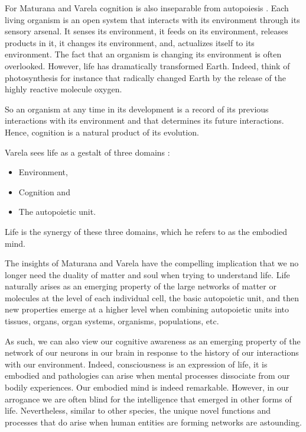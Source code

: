 \documentclass[
  11pt,
]{book}
\providecommand{\tightlist}{%
  \setlength{\itemsep}{0pt}\setlength{\parskip}{0pt}}
\begin{document}
For Maturana and Varela cognition is also inseparable from autopoiesis \citep{capraLuisi2014}. Each living organism is an open system that interacts with its environment through its sensory arsenal. It senses its environment, it feeds on its environment, releases products in it, it changes its environment, and, actualizes itself to its environment. The fact that an organism is changing its environment is often overlooked. However, life has dramatically transformed Earth. Indeed, think of photosynthesis for instance that radically changed Earth by the release of the highly reactive molecule oxygen.

So an organism at any time in its development is a record of its previous interactions with its environment and that determines its future interactions.
Hence, cognition is a natural product of its evolution.

Varela sees life as a gestalt of three domains \citep{capraLuisi2014}:

\begin{itemize}
\tightlist
\item
  Environment,
\item
  Cognition and
\item
  The autopoietic unit.
\end{itemize}

Life is the synergy of these three domains, which he refers to as the embodied mind.

The insights of Maturana and Varela have the compelling implication that we no longer need the duality of matter and soul when trying to understand life. Life naturally arises as an emerging property of the large networks of matter or molecules at the level of each individual cell, the basic autopoietic unit, and then new properties emerge at a higher level when combining autopoietic units into tissues, organs, organ systems, organisms, populations, etc.

As such, we can also view our cognitive awareness as an emerging property of the network of our neurons in our brain in response to the history of our interactions with our environment. Indeed, consciousness is an expression of life, it is embodied and pathologies can arise when mental processes dissociate from our bodily experiences. Our embodied mind is indeed remarkable. However, in our arrogance we are often blind for the intelligence that emerged in other forms of life. Nevertheless, similar to other species, the unique novel functions and processes that do arise when human entities are forming networks are astounding.
\end{document}
